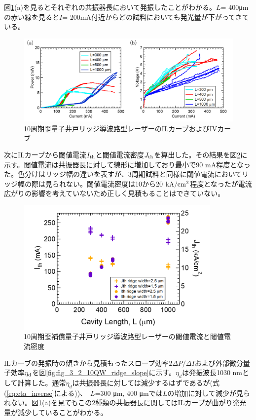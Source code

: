 {{図\ref{fig:fig_3_2_10QW_ridge_IL}(a)を見るとそれぞれの共振器長において発振したことがわかる。$L$= 400\si{\micro\metre}の赤い線を見ると$I$= 200mA付近からどの試料においても発光量が下がってきている。
\begin{figure}[h]
	\centering
	\includegraphics[width=15cm]{figure/fig_3_2_10QW_ridge_IL.png}
		\caption{10周期歪量子井戸リッジ導波路型レーザーのILカーブおよびIVカーブ}
		\label{fig:fig_3_2_10QW_ridge_IL}
\end{figure}
次にILカーブから閾値電流$I_{\rm{th}}$と閾値電流密度$J_{\rm{th}}$を算出した。その結果を図\ref{fig:fig_3_2_10QW_ridge_Ith}に示す。閾値電流は共振器長に対して線形に増加しており最小で90 mA程度となった。色分けはリッジ幅の違いを表すが、3周期試料と同様に閾値電流においてリッジ幅の際は見られない。閾値電流密度は10から20 $\rm{kA/cm^{2}}$程度となったが電流広がりの影響を考えていないため正しく見積もることはできていない。
\begin{figure}[h]
	\centering
	\includegraphics[width=10cm]{figure/fig_3_2_10QW_ridge_Ith.png}
		\caption{10周期歪補償量子井戸リッジ導波路型レーザーの閾値電流と閾値電流密度}
		\label{fig:fig_3_2_10QW_ridge_Ith}
\end{figure}
ILカーブの発振時の傾きから見積もったスロープ効率$2\Delta P/\Delta I$および外部微分量子効率$\eta_{\rm{d}}$を図\ref{fig:fig_3_2_10QW_ridge_slope}に示す。$\eta_{d}$は発振波長1030 nmとして計算した。通常$\eta_{d}$は共振器長に対しては減少するはずであるが(式(\ref{eq:eta_inverse}による))、　$L$=300 \si{\micro\metre},  400  \si{\micro\metre}では$L$の増加に対して減少が見られない。図\ref{fig:fig_3_2_10QW_ridge_IL}(a)を見てもこの2種類の共振器長に関してはILカーブが曲がり発光量が減少していることがわかる。


}}
